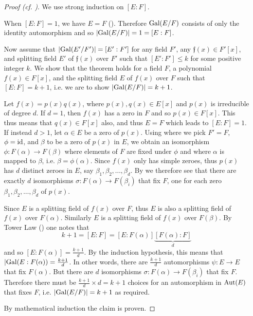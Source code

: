 \begin{proof}[Proof (cf. {\cite[Theorem 23.7]{judson_beezer_2022}})]
    We use strong induction on $[E:F]$.

    When $[E:F] = 1$, we have $E = F$ (). Therefore $\mathrm{Gal}(E/F)$ consists of only the identity automorphism and so $|\mathrm{Gal}(E/F)| = 1 = [E:F]$.

    Now assume that $|\mathrm{Gal}(E'/F')| = [E':F']$ for any field $F'$, any $\mathfrak{f}(x) \in F'[x]$, and splitting field $E'$ of $\mathfrak{f}(x)$ over $F'$ such that $[E':F'] \leq k$ for some positive integer $k$. We show that the theorem holds for a field $F$, a polynomial $f(x) \in F[x]$, and the splitting field $E$ of $f(x)$ over $F$ such that $[E:F] = k+1$, i.e. we are to show $|\mathrm{Gal}(E/F)| = k + 1$.

    Let $f(x) = p(x)q(x)$, where $p(x), q(x) \in E[x]$ and $p(x)$ is irreducible of degree $d$. If $d = 1$, then $f(x)$ has a zero in $F$ and so $p(x) \in F[x]$. This thus means that $q(x) \in F[x]$ also, and thus $E = F$ which leads to $[E:F] = 1$. If instead $d > 1$, let $\alpha \in E$ be a zero of $p(x)$. Using  where we pick $F' = F$, $\phi = \mathrm{id}$, and $\beta$ to be a zero of $p(x)$ in $E$, we obtain an isomorphism $\phi: F(\alpha) \to F(\beta)$ where elements of $F$ are fixed under $\phi$ and where $\alpha$ is mapped to $\beta$, i.e. $\beta = \phi(\alpha)$. Since $f(x)$ only has simple zeroes, thus $p(x)$ has $d$ distinct zeroes in $E$, say $\beta_1, \beta_2, \dots, \beta_d$. By  we therefore see that there are exactly $d$ isomorphisms $\sigma: F(\alpha) \to F(\beta_i)$ that fix $F$, one for each zero $\beta_1, \beta_2, \dots, \beta_d$ of $p(x)$.

    Since $E$ is a splitting field of $f(x)$ over $F$, thus $E$ is also a splitting field of $f(x)$ over $F(\alpha)$. Similarly $E$ is a splitting field of $f(x)$ over $F(\beta)$. By Tower Law () one notes that
    \[
        k+1 = [E:F] = [E:F(\alpha)]\underbrace{[F(\alpha):F]}_{d}
    \]
    and so $[E:F(\alpha)] = \frac{k + 1}{d}$. By the induction hypothesis, this means that $|\mathrm{Gal}(E:F(\alpha)) = \frac{k+1}{d}$. In other words, there are $\frac{k+1}{d}$ automorphisms $\psi: E \to E$ that fix $F(\alpha)$. But there are $d$ isomorphisms $\sigma: F(\alpha) \to F(\beta_i)$ that fix $F$. Therefore there must be $\frac{k+1}{d} \times d = k+1$ choices for an automorphism in $\mathrm{Aut}(E)$ that fixes $F$, i.e. $|\mathrm{Gal}(E/F)| = k+1$ as required.

    By mathematical induction the claim is proven.
\end{proof}

